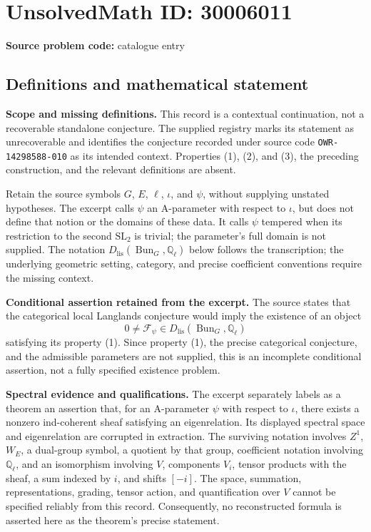 \documentclass[11pt]{article}
\newcommand{\Q}{\mathbb{Q}}
\begin{document}
\section*{UnsolvedMath ID: 30006011}
\textbf{Source problem code:} catalogue entry
\subsection{Definitions and mathematical statement}
\textbf{Scope and missing definitions.} This record is a contextual continuation, not a recoverable standalone conjecture. The supplied registry marks its statement as unrecoverable and identifies the conjecture recorded under source code \texttt{OWR-14298588-010} as its intended context. Properties (1), (2), and (3), the preceding construction, and the relevant definitions are absent.

Retain the source symbols \(G\), \(E\), \(\ell\), \(\iota\), and \(\psi\), without supplying unstated hypotheses. The excerpt calls \(\psi\) an A-parameter with respect to \(\iota\), but does not define that notion or the domains of these data. It calls \(\psi\) tempered when its restriction to the second \(\mathrm{SL}_2\) is trivial; the parameter's full domain is not supplied. The notation \(D_{\mathrm{lis}}(\operatorname{Bun}_G,\Q_\ell)\) below follows the transcription; the underlying geometric setting, category, and precise coefficient conventions require the missing context.

\textbf{Conditional assertion retained from the excerpt.} The source states that the categorical local Langlands conjecture would imply the existence of an object
\[
0\ne\mathcal F_\psi\in D_{\mathrm{lis}}(\operatorname{Bun}_G,\Q_\ell)
\]
satisfying its property (1). Since property (1), the precise categorical conjecture, and the admissible parameters are not supplied, this is an incomplete conditional assertion, not a fully specified existence problem.

\textbf{Spectral evidence and qualifications.} The excerpt separately labels as a theorem an assertion that, for an A-parameter \(\psi\) with respect to \(\iota\), there exists a nonzero ind-coherent sheaf satisfying an eigenrelation. Its displayed spectral space and eigenrelation are corrupted in extraction. The surviving notation involves \(Z^1\), \(W_E\), a dual-group symbol, a quotient by that group, coefficient notation involving \(\Q_\ell\), and an isomorphism involving \(V\), components \(V_i\), tensor products with the sheaf, a sum indexed by \(i\), and shifts \([-i]\). The space, summation, representations, grading, tensor action, and quantification over \(V\) cannot be specified reliably from this record. Consequently, no reconstructed formula is asserted here as the theorem's precise statement.
\end{document}
